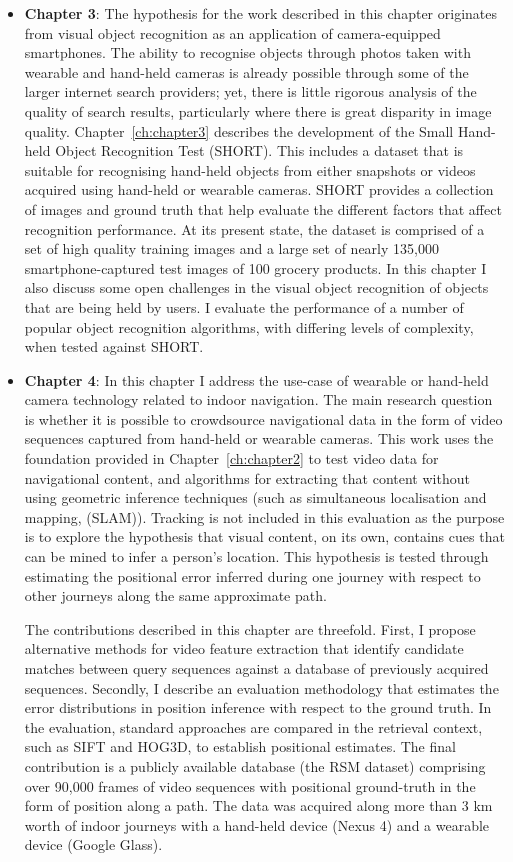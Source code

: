 \begin{itemize}
\item \textbf{Chapter 3}: The hypothesis for the work described in this chapter originates from visual object recognition as an application of camera-equipped smartphones. The ability to recognise objects through photos taken with wearable and hand-held cameras is already possible through some of the larger internet search providers; yet, there is little rigorous analysis of the quality of search results, particularly where there is great disparity in image quality. Chapter~\ref{ch:chapter3} describes the development of the Small Hand-held Object Recognition Test (SHORT). This includes a dataset that is suitable for recognising hand-held objects from either snapshots or videos acquired using hand-held or wearable cameras. SHORT provides a collection of images and ground truth that help evaluate the different factors that affect recognition performance. At its present state, the dataset is comprised of a set of high quality training images and a large set of nearly 135,000 smartphone-captured test images of 100 grocery products. In this chapter I also discuss some open challenges in the visual object recognition of objects that are being held by users. I evaluate the performance of a number of popular object recognition algorithms, with differing levels of complexity, when tested against SHORT.


\item \textbf{Chapter 4}: In this chapter I address the use-case of wearable or hand-held camera technology related to indoor navigation. The main research question is whether it is possible to crowdsource navigational data in the form of video sequences captured from hand-held or wearable cameras.  This work uses the foundation provided in Chapter~\ref{ch:chapter2} to test video data for navigational content, and algorithms for extracting that content without using geometric inference techniques (such as simultaneous localisation and mapping, (SLAM)).  Tracking is not included in this evaluation as the purpose is to explore the hypothesis that visual content, on its own, contains cues that can be mined to infer a person's location.  This hypothesis is tested through estimating the positional error inferred during one journey with respect to other journeys along the same approximate path.

The contributions described in this chapter are threefold. First, I propose alternative methods for video feature extraction that identify candidate matches between query sequences against a database of previously acquired sequences. Secondly, I describe an evaluation methodology that estimates the error distributions in position inference with respect to the ground truth. In the evaluation, standard approaches are compared in the retrieval context, such as SIFT and HOG3D, to establish positional estimates. The final contribution is a publicly available database (the RSM dataset) comprising over 90,000 frames of video sequences with positional ground-truth in the form of position along a path. The data was acquired along more than 3 km worth of indoor journeys with a hand-held device (Nexus 4) and a wearable device (Google Glass).


\end{itemize}
